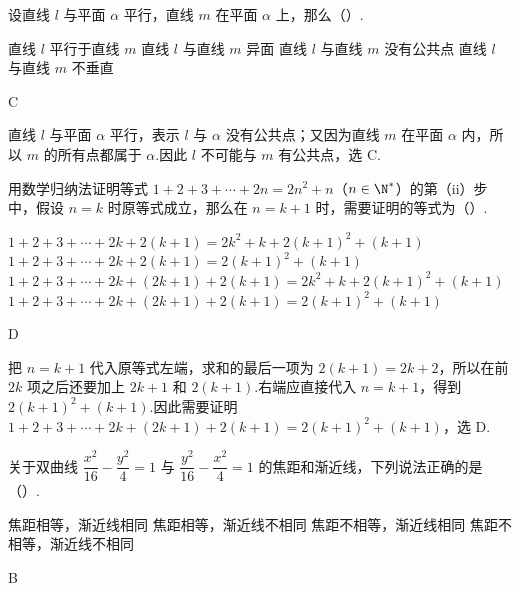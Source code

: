 \begin{problem}
设直线 \(l\) 与平面 \(\alpha\) 平行，直线 \(m\) 在平面 \(\alpha\) 上，那么（\quad）.

\choices
    {直线 \(l\) 平行于直线 \(m\)}
    {直线 \(l\) 与直线 \(m\) 异面}
    {直线 \(l\) 与直线 \(m\) 没有公共点}
    {直线 \(l\) 与直线 \(m\) 不垂直}
\end{problem}

\begin{answer}
C
\end{answer}

\begin{solution}
直线 \(l\) 与平面 \(\alpha\) 平行，表示 \(l\) 与 \(\alpha\) 没有公共点；又因为直线 \(m\) 在平面 \(\alpha\) 内，所以 \(m\) 的所有点都属于 \(\alpha\).因此 \(l\) 不可能与 \(m\) 有公共点，选 C.
\end{solution}

\begin{problem}
用数学归纳法证明等式 \(1+2+3+\cdots+2n=2n^2+n\)（\(n\in\N^*\)）的第（ii）步中，假设 \(n=k\) 时原等式成立，那么在 \(n=k+1\) 时，需要证明的等式为（\quad）.

\choices
    {\(1+2+3+\cdots+2k+2(k+1)=2k^2+k+2(k+1)^2+(k+1)\)}
    {\(1+2+3+\cdots+2k+2(k+1)=2(k+1)^2+(k+1)\)}
    {\(1+2+3+\cdots+2k+(2k+1)+2(k+1)=2k^2+k+2(k+1)^2+(k+1)\)}
    {\(1+2+3+\cdots+2k+(2k+1)+2(k+1)=2(k+1)^2+(k+1)\)}
\end{problem}

\begin{answer}
D
\end{answer}

\begin{solution}
把 \(n=k+1\) 代入原等式左端，求和的最后一项为 \(2(k+1)=2k+2\)，所以在前 \(2k\) 项之后还要加上 \(2k+1\) 和 \(2(k+1)\).右端应直接代入 \(n=k+1\)，得到 \(2(k+1)^2+(k+1)\).因此需要证明
\(1+2+3+\cdots+2k+(2k+1)+2(k+1)=2(k+1)^2+(k+1)\)，选 D.
\end{solution}

\begin{problem}
关于双曲线 \(\dfrac{x^2}{16}-\dfrac{y^2}{4}=1\) 与 \(\dfrac{y^2}{16}-\dfrac{x^2}{4}=1\) 的焦距和渐近线，下列说法正确的是（\quad）.

\choices
    {焦距相等，渐近线相同}
    {焦距相等，渐近线不相同}
    {焦距不相等，渐近线相同}
    {焦距不相等，渐近线不相同}
\end{problem}

\begin{answer}
B
\end{answer}

